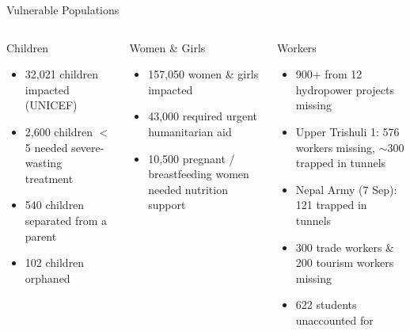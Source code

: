 \documentclass[aspectratio=169, 12pt]{beamer}
\begin{document}
	\begin{frame}{Vulnerable Populations}
		\begin{columns}[T]
			\begin{block}{Children}
				\begin{itemize}
					\item 32{,}021 children impacted (UNICEF)
					\item 2{,}600 children $<$5 needed severe-wasting treatment
					\item 540 children separated from a parent
					\item 102 children orphaned
				\end{itemize}
			\end{block}
			
			\vspace{4pt}
			\begin{block}{Women \& Girls}
				\begin{itemize}
					\item 157{,}050 women \& girls impacted
					\item 43{,}000 required urgent humanitarian aid
					\item 10{,}500 pregnant / breastfeeding women needed
					nutrition support
				\end{itemize}
			\end{block}
			
			\begin{block}{Workers}
				\begin{itemize}
					\item 900+ from 12 hydropower projects missing
					\item Upper Trishuli 1: 576 workers missing,
					$\sim$300 trapped in tunnels
					\item Nepal Army (7 Sep): 121 trapped in tunnels
					\item 300 trade workers \& 200 tourism workers missing
					\item 622 students unaccounted for
				\end{itemize}
			\end{block}
		\end{columns}
	\end{frame}
	
\end{document}
